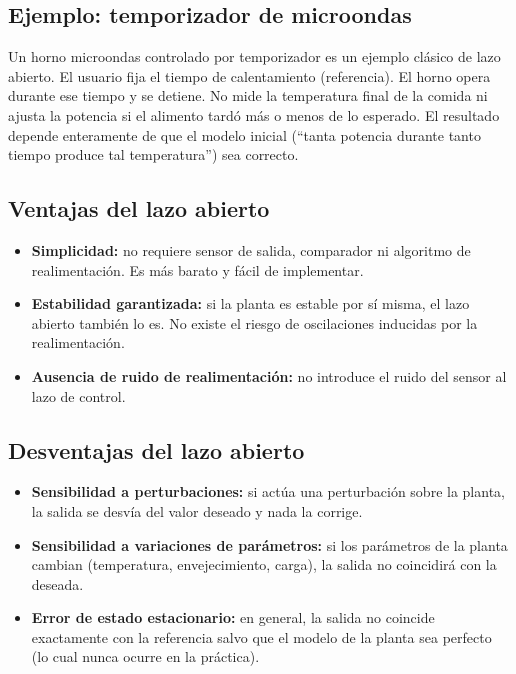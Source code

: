 \subsection{Ejemplo: temporizador de microondas}

Un horno microondas controlado por temporizador es un ejemplo clásico de
lazo abierto. El usuario fija el tiempo de calentamiento (referencia).
El horno opera durante ese tiempo y se detiene. No mide la temperatura
final de la comida ni ajusta la potencia si el alimento tardó más o menos
de lo esperado. El resultado depende enteramente de que el modelo inicial
(``tanta potencia durante tanto tiempo produce tal temperatura'') sea correcto.

\subsection{Ventajas del lazo abierto}

\begin{itemize}
  \item \textbf{Simplicidad:} no requiere sensor de salida, comparador ni
    algoritmo de realimentación. Es más barato y fácil de implementar.
  \item \textbf{Estabilidad garantizada:} si la planta es estable por sí
    misma, el lazo abierto también lo es. No existe el riesgo de oscilaciones
    inducidas por la realimentación.
  \item \textbf{Ausencia de ruido de realimentación:} no introduce el ruido
    del sensor al lazo de control.
\end{itemize}

\subsection{Desventajas del lazo abierto}

\begin{itemize}
  \item \textbf{Sensibilidad a perturbaciones:} si actúa una perturbación
    sobre la planta, la salida se desvía del valor deseado y nada la corrige.
  \item \textbf{Sensibilidad a variaciones de parámetros:} si los parámetros
    de la planta cambian (temperatura, envejecimiento, carga), la salida
    no coincidirá con la deseada.
  \item \textbf{Error de estado estacionario:} en general, la salida no
    coincide exactamente con la referencia salvo que el modelo de la planta
    sea perfecto (lo cual nunca ocurre en la práctica).
\end{itemize}

